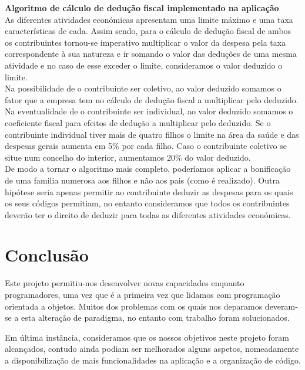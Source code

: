 \documentclass[10pt,a4paper]{article}
\begin{document}
{\bf{Algoritmo de cálculo de dedução fiscal implementado na aplicação}}\\

As diferentes atividades económicas apresentam uma limite máximo e uma taxa características de cada. Assim sendo, para o cálculo de dedução fiscal de ambos os contribuintes tornou-se imperativo multiplicar o valor da despesa pela taxa correspondente à sua natureza e ir somando o valor das deduções de uma mesma atividade e no caso de esse exceder o limite, consideramos o valor deduzido o limite.\\
\indent Na possibilidade de o contribuinte ser coletivo, ao valor deduzido somamos o fator que a empresa tem no cálculo de dedução fiscal a multiplicar pelo deduzido. Na eventualidade de o contribuinte ser individual, ao valor deduzido somamos o coeficiente fiscal para efeitos de dedução a multiplicar pelo deduzido. Se o contribuinte individual tiver mais de quatro filhos o limite na área da saúde e das despesas gerais aumenta em 5\% por cada filho. Caso o contribuinte coletivo se situe num concelho do interior, aumentamos 20\% do valor deduzido.\\
\indent De modo a tornar o algoritmo mais completo, poderíamos aplicar a bonificação de uma familia numerosa aos filhos e não aos pais (como é realizado). Outra hipótese seria apenas permitir ao contribuinte deduzir as despesas para os quais os seus códigos permitiam, no entanto consideramos que todos os contribuintes deverão ter o direito de deduzir para todas as diferentes atividades económicas.

\cleardoublepage

\section{Conclusão}
\label{sec:conclusao}
Este projeto permitiu-nos desenvolver novas capacidades enquanto programadores, uma vez que é a primeira vez que lidamos com programação orientada a objetos. Muitos dos problemas com os quais nos deparamos deveram-se a esta alteração de paradigma, no entanto com trabalho foram solucionados. 

Em última instância, consideramos que os nossos objetivos neste projeto foram alcançados, contudo ainda podiam ser melhorados alguns aspetos, nomeadamente a disponibilização de mais funcionalidades na aplicação e a organização de código.
\end{document}
